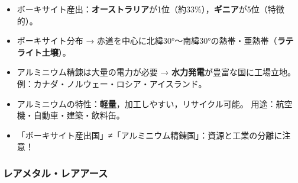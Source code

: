\documentclass[a4paper,11pt]{article}
\newcommand{\imp}[1]{\textbf{\textcolor{mainred}{#1}}}
\begin{document}
\begin{tcolorbox}[warnbox, title={🔑 ボーキサイト・アルミの統計判定ポイント}]
\begin{itemize}[leftmargin=1em]
  \item ボーキサイト産出：\imp{オーストラリア}が1位（約33\%），\imp{ギニア}が5位（特徴的）。
  \item ボーキサイト分布 → 赤道を中心に北緯30°〜南緯30°の熱帯・亜熱帯（\imp{ラテライト土壌}）。
  \item アルミニウム精錬は大量の電力が必要 → \imp{水力発電}が豊富な国に工場立地。
    例：カナダ・ノルウェー・ロシア・アイスランド。
  \item アルミニウムの特性：\imp{軽量}，加工しやすい，リサイクル可能。
    用途：航空機・自動車・建築・飲料缶。
  \item 「ボーキサイト産出国」≠「アルミニウム精錬国」：資源と工業の分離に注意！
\end{itemize}
\end{tcolorbox}

\vspace{2mm}

\subsubsection{レアメタル・レアアース}
\end{document}
